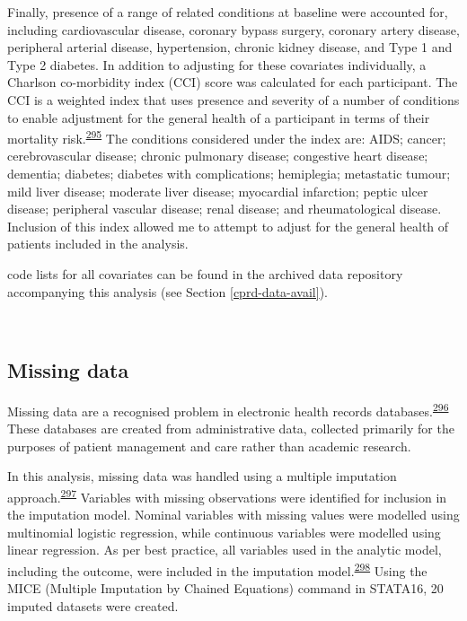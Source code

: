 \documentclass[a4paper, twoside]{templates/ociamthesis}
\begin{document}
Finally, presence of a range of related conditions at baseline were accounted for, including cardiovascular disease, coronary bypass surgery, coronary artery disease, peripheral arterial disease, hypertension, chronic kidney disease, and Type 1 and Type 2 diabetes. In addition to adjusting for these covariates individually, a Charlson co-morbidity index (CCI) score was calculated for each participant. The CCI is a weighted index that uses presence and severity of a number of conditions to enable adjustment for the general health of a participant in terms of their mortality risk.\textsuperscript{\protect\hyperlink{ref-charlson1987new}{295}} The conditions considered under the index are: AIDS; cancer; cerebrovascular disease; chronic pulmonary disease; congestive heart disease; dementia; diabetes; diabetes with complications; hemiplegia; metastatic tumour; mild liver disease; moderate liver disease; myocardial infarction; peptic ulcer disease; peripheral vascular disease; renal disease; and rheumatological disease. Inclusion of this index allowed me to attempt to adjust for the general health of patients included in the analysis.

code lists for all covariates can be found in the archived data repository accompanying this analysis (see Section \ref{cprd-data-avail}).

~

\hypertarget{missing-data}{%
\subsection{Missing data}\label{missing-data}}

Missing data are a recognised problem in electronic health records databases.\textsuperscript{\protect\hyperlink{ref-wells2013strategies}{296}} These databases are created from administrative data, collected primarily for the purposes of patient management and care rather than academic research.

In this analysis, missing data was handled using a multiple imputation approach.\textsuperscript{\protect\hyperlink{ref-sterne2009}{297}} Variables with missing observations were identified for inclusion in the imputation model. Nominal variables with missing values were modelled using multinomial logistic regression, while continuous variables were modelled using linear regression. As per best practice, all variables used in the analytic model, including the outcome, were included in the imputation model.\textsuperscript{\protect\hyperlink{ref-moons2006}{298}} Using the MICE (Multiple Imputation by Chained Equations) command in STATA16, 20 imputed datasets were created.
\end{document}
